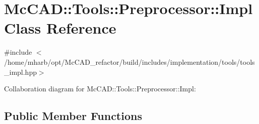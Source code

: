 \hypertarget{classMcCAD_1_1Tools_1_1Preprocessor_1_1Impl}{}\section{Mc\+C\+AD\+:\+:Tools\+:\+:Preprocessor\+:\+:Impl Class Reference}
\label{classMcCAD_1_1Tools_1_1Preprocessor_1_1Impl}


{\ttfamily \#include $<$/home/mharb/opt/\+Mc\+C\+A\+D\+\_\+refactor/build/includes/implementation/tools/tools\+\_\+impl.\+hpp$>$}



Collaboration diagram for Mc\+C\+AD\+:\+:Tools\+:\+:Preprocessor\+:\+:Impl\+:
\subsection*{Public Member Functions}
